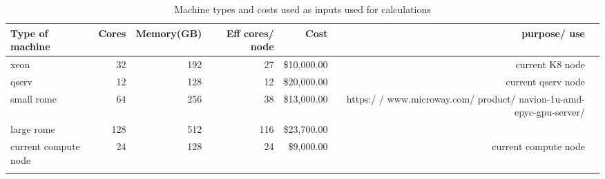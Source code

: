 \tiny \begin{longtable} { |p{}  |r  |r  |r  |r  |r  |r |} 
\caption{Machine types and costs used as inputs used for calculations \label{tab:Machines}}\\ 
\hline 
\textbf{Type of machine }&\textbf{Cores}&\textbf{Memory(GB)}&\textbf{Eff cores/ node}&\textbf{Cost}&\textbf{purpose/ use } \\ \hline
{xeon }&{32}&{192}&{27}&{\$10,000.00}&{current K8 node } \\ \hline
{qserv }&{12}&{128}&{12}&{\$20,000.00}&{current qserv node } \\ \hline
{small rome  }&{64}&{256}&{38}&{\$13,000.00}&{https:/ / www.microway.com/ product/ navion-1u-amd-epyc-gpu-server/ } \\ \hline
{large rome }&{128}&{512}&{116}&{\$23,700.00}& \\ \hline
{current compute node }&{24}&{128}&{24}&{\$9,000.00}&{current compute node} \\ \hline
{}&{}&{}&{}&{}&{} \\ \hline
\end{longtable} \normalsize
